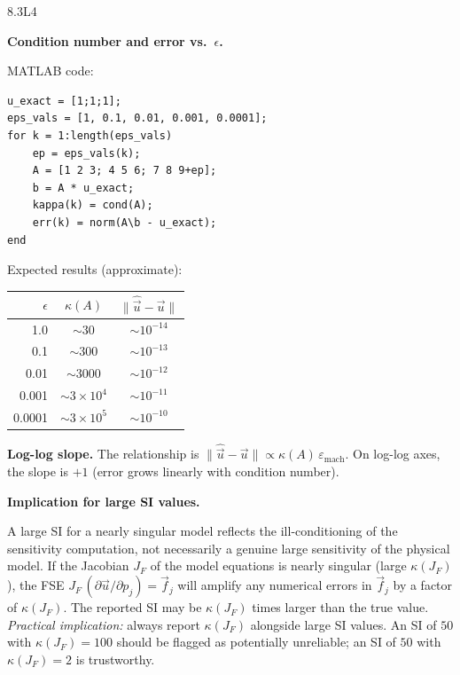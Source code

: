 \begin{solution}{8.3}{L4}

\solanswer

 \textbf{Condition number and error vs.\ $\epsilon$.}

MATLAB code:
\begin{verbatim}
u_exact = [1;1;1];
eps_vals = [1, 0.1, 0.01, 0.001, 0.0001];
for k = 1:length(eps_vals)
    ep = eps_vals(k);
    A = [1 2 3; 4 5 6; 7 8 9+ep];
    b = A * u_exact;
    kappa(k) = cond(A);
    err(k) = norm(A\b - u_exact);
end
\end{verbatim}

Expected results (approximate):

\begin{center}
\begin{tabular}{rcc}
\toprule
$\epsilon$ & $\kappa(A)$ & $\|\hat{\vec{u}} - \vec{u}\|$ \\
\midrule
1.0    & $\sim 30$    & $\sim 10^{-14}$ \\
0.1    & $\sim 300$   & $\sim 10^{-13}$ \\
0.01   & $\sim 3000$  & $\sim 10^{-12}$ \\
0.001  & $\sim 3\times10^4$ & $\sim 10^{-11}$ \\
0.0001 & $\sim 3\times10^5$ & $\sim 10^{-10}$ \\
\bottomrule
\end{tabular}
\end{center}

 \textbf{Log-log slope.}
The relationship is $\|\hat{\vec{u}} - \vec{u}\| \propto \kappa(A)\,\varepsilon_{\text{mach}}$.
On log-log axes, the slope is $+1$ (error grows linearly with condition number).

 \textbf{Implication for large SI values.}

A large SI for a nearly singular model reflects the ill-conditioning of the
sensitivity computation, not necessarily a genuine large sensitivity of the
physical model. If the Jacobian $J_F$ of the model equations is nearly
singular (large $\kappa(J_F)$), the FSE $J_F\,(\partial\vec{u}/\partial p_j) = \vec{f}_j$
will amplify any numerical errors in $\vec{f}_j$ by a factor of $\kappa(J_F)$.
The reported SI may be $\kappa(J_F)$ times larger than the true value.
\textit{Practical implication:} always report $\kappa(J_F)$ alongside
large SI values. An SI of $50$ with $\kappa(J_F) = 100$ should be
flagged as potentially unreliable; an SI of $50$ with $\kappa(J_F) = 2$ is trustworthy.


\end{solution}

